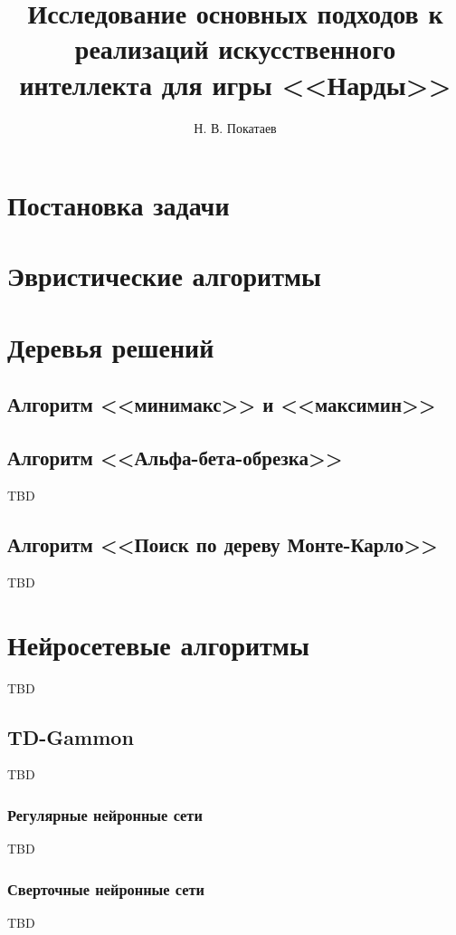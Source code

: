 \documentclass{ammstudconf}
\title{Исследование основных подходов к реализаций искусственного интеллекта для игры <<Нарды>>}
\author{Н. В. Покатаев}
\begin{document}
\maketitle



\section{Постановка задачи}


\section{Эвристические алгоритмы}


\section{Деревья решений}


\subsection{Алгоритм <<минимакс>> и <<максимин>>}


\subsection{Алгоритм <<Альфа-бета-обрезка>>}
TBD

\subsection{Алгоритм <<Поиск по дереву Монте-Карло>>}
TBD

\section{Нейросетевые алгоритмы}
TBD

\subsection{TD-Gammon}
TBD

\subsubsection{Регулярные нейронные сети}
TBD

\subsubsection{Сверточные нейронные сети}
TBD
\end{document}
